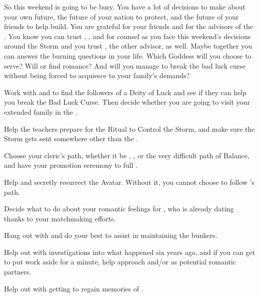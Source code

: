 \documentclass[char]{GL2020}
\begin{document}
So this weekend is going to be busy. You have a lot of decisions to make about your own future, the future of your nation to protect, and the future of your friends to help build. You are grateful for your friends and for the advisors of the \pShip{}. You know you can trust \cEbbPriest{}, \cJuniorStatesman{}, and \cBunker{} for counsel as you face this weekend’s decisions around the Storm and you trust \cChupLeader{\full}, the other advisor, as well. Maybe together you can answer the burning questions in your life. Which Goddess will you choose to serve? Will \cPresident{} or \cChupAvenger{} find romance? And will you manage to break the bad luck curse without being forced to acquiesce to your \pFarm{} family's demands?

\begin{itemz}
    \item Work with \cPresident{} and \cWarlordDaughter{} to find the followers of a Deity of Luck and see if they can help you break the Bad Luck Curse. Then decide whether you are going to visit your extended family in the \pFarm{}.
    \item Help the teachers prepare for the Ritual to Control the Storm, and make sure the Storm gets sent somewhere other than the \pShip{}.
    \item Choose your cleric's path, whether it be \cEbbFull{\full}, \cFlowFull{\full}, or the very difficult path of Balance, and have your promotion ceremony to full \cInitiate{\cleric}.
    \item Help \cFlowPriest{} and \cEbbPriest{} secretly resurrect the \cEbb{} Avatar. Without it, you cannot choose to follow \cEbb{}'s path.
    \item Decide what to do about your romantic feelings for \cWarlordDaughter{}, who is already dating \cTechStar{} thanks to your matchmaking efforts.
    \item Hang out with \cBunker{} and do your best to assist \cBunker{\them} in maintaining the bunkers.
    \item Help \cPresident{} out with \cPresident{\their} investigations into what happened six years ago, and if you can get \cPresident{\them} to put work aside for a minute, help \cPresident{\them} approach \cHeir{} and/or \cChupStudent{} as potential romantic partners.
    \item Help \cChupAvenger{} out with getting \cHeadScientist{} to regain \cHeadScientist{\their} memories of \cChupAvenger{}.
\end{itemz}
\end{document}
